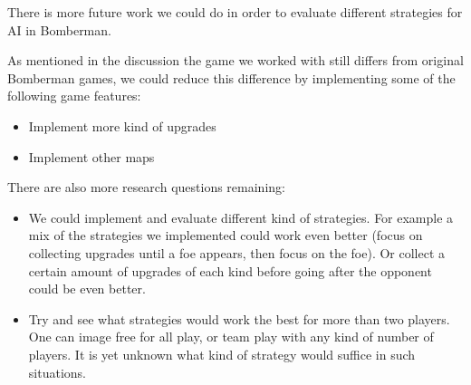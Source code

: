 %
There is more future work we could do in order to evaluate different
strategies for AI in Bomberman.

As mentioned in the discussion the game we worked with still differs
from original Bomberman games, we could reduce this difference by
implementing some of the following game features:
\begin{itemize}
\item Implement more kind of upgrades
\item Implement other maps
\end{itemize}

There are also more research questions remaining:
\begin{itemize}
\item We could implement and evaluate different kind of strategies. For example
a mix of the strategies we implemented could work even better
(focus on collecting upgrades until a foe appears, then focus on the foe). Or
collect a certain amount of upgrades of each kind before going after the opponent
could be even better.
\item Try and see what strategies would work the best for more than two
players. One can image free for all play, or team play with any kind of number
of players. It is yet unknown what kind of strategy would suffice in such
situations.
\end{itemize}

